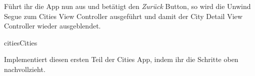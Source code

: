 \documentclass[parskip=half, final]{scrreprt}
\begin{document}
\begin{lecture}
\begin{enumerate}

Führt ihr die App nun aus und betätigt den \emph{Zurück} Button, so wird die Unwind Segue zum Cities View Controller ausgeführt und damit der City Detail View Controller wieder ausgeblendet.

\end{enumerate}

\begin{exc}
\begin{excitem}{cities}{Cities}

Implementiert diesen ersten Teil der Cities App, indem ihr die Schritte oben nachvollzieht.

\end{excitem}
\end{exc}


\end{lecture}
\end{document}

